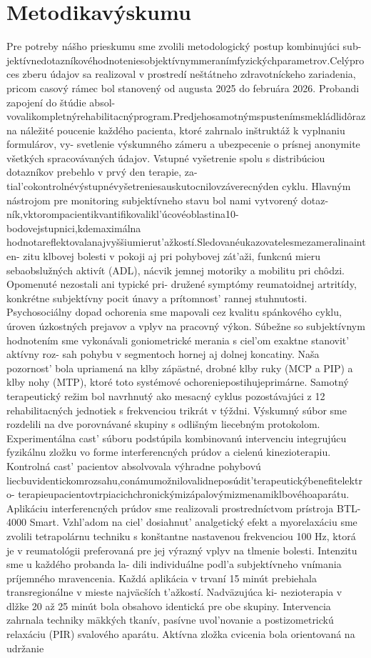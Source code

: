 \section{Metodikavýskumu}

Pre potreby nášho prieskumu sme zvolili metodologický postup kombinujúci sub- jektívnedotazníkovéhodnoteniesobjektívnymmeranímfyzickýchparametrov.Celýproces zberu údajov sa realizoval v prostredí neštátneho zdravotníckeho zariadenia, pricom casový rámec bol stanovený od augusta 2025 do februára 2026. Probandi zapojení do štúdie absol- vovalikompletnýrehabilitacnýprogram.Predjehosamotnýmspustenímsmekládlidôrazna náležité poucenie každého pacienta, ktoré zahrnalo inštruktáž k vyplnaniu formulárov, vy- svetlenie výskumného zámeru a ubezpecenie o prísnej anonymite všetkých spracovávaných údajov. Vstupné vyšetrenie spolu s distribúciou dotazníkov prebehlo v prvý den terapie, za- tial’cokontrolnévýstupnévyšetreniesauskutocnilovzáverecnýden cyklu. Hlavným nástrojom pre monitoring subjektívneho stavu bol nami vytvorený dotaz- ník,vktorompacientikvantifikovalikl’úcovéoblastina10-bodovejstupnici,kdemaximálna hodnotareflektovalanajvyššiumierut’ažkostí.Sledovanéukazovatelesmezameralinainten- zitu klbovej bolesti v pokoji aj pri pohybovej zát’aži, funkcnú mieru sebaobslužných aktivít (ADL), nácvik jemnej motoriky a mobilitu pri chôdzi. Opomenuté nezostali ani typické pri- družené symptómy reumatoidnej artritídy, konkrétne subjektívny pocit únavy a prítomnost’ rannej stuhnutosti. Psychosociálny dopad ochorenia sme mapovali cez kvalitu spánkového cyklu, úroven úzkostných prejavov a vplyv na pracovný výkon. Súbežne so subjektívnym hodnotením sme vykonávali goniometrické merania s ciel’om exaktne stanovit’ aktívny roz- sah pohybu v segmentoch hornej aj dolnej koncatiny. Naša pozornost’ bola upriamená na klby zápästné, drobné klby ruky (MCP a PIP) a klby nohy (MTP), ktoré toto systémové ochoreniepostihujeprimárne. Samotný terapeutický režim bol navrhnutý ako mesacný cyklus pozostávajúci z 12 rehabilitacných jednotiek s frekvenciou trikrát v týždni. Výskumný súbor sme rozdelili na dve porovnávané skupiny s odlišným liecebným protokolom. Experimentálna cast’ súboru podstúpila kombinovanú intervenciu integrujúcu fyzikálnu zložku vo forme interferencných prúdov a cielenú kinezioterapiu. Kontrolná cast’ pacientov absolvovala výhradne pohybovú liecbuvidentickomrozsahu,conámumožnilovalidneposúdit’terapeutickýbenefitelektro- terapieupacientovtrpiacichchronickýmizápalovýmizmenamiklbovéhoaparátu. Aplikáciu interferencných prúdov sme realizovali prostredníctvom prístroja BTL- 4000 Smart. Vzhl’adom na ciel’ dosiahnut’ analgetický efekt a myorelaxáciu sme zvolili tetrapolárnu techniku s konštantne nastavenou frekvenciou 100 Hz, ktorá je v reumatológii preferovaná pre jej výrazný vplyv na tlmenie bolesti. Intenzitu sme u každého probanda la- dili individuálne podl’a subjektívneho vnímania príjemného mravencenia. Každá aplikácia v trvaní 15 minút prebiehala transregionálne v mieste najväcších t’ažkostí. Nadväzujúca ki- nezioterapia v dlžke 20 až 25 minút bola obsahovo identická pre obe skupiny. Intervencia zahrnala techniky mäkkých tkanív, pasívne uvol’novanie a postizometrickú relaxáciu (PIR) svalového aparátu. Aktívna zložka cvicenia bola orientovaná na udržanie 